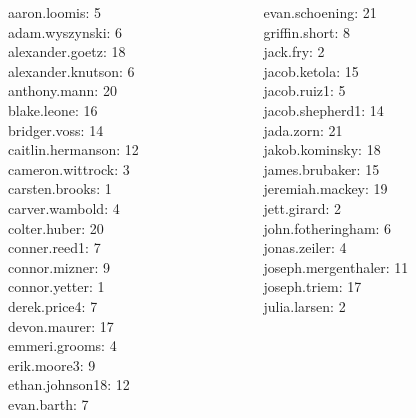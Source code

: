 \documentclass[10pt]{beamer}
\begin{document}
\begin{frame}
\footnotesize 
\vfill 
\begin{columns}
\begin{column}{0.33\textwidth}
aaron.loomis: 5 \\ 
adam.wyszynski: 6 \\ 
alexander.goetz: 18 \\ 
alexander.knutson: 6 \\ 
anthony.mann: 20 \\ 
blake.leone: 16 \\ 
bridger.voss: 14 \\ 
caitlin.hermanson: 12 \\ 
cameron.wittrock: 3 \\ 
carsten.brooks: 1 \\ 
carver.wambold: 4 \\ 
colter.huber: 20 \\ 
conner.reed1: 7 \\ 
connor.mizner: 9 \\ 
connor.yetter: 1 \\ 
derek.price4: 7 \\ 
devon.maurer: 17 \\ 
emmeri.grooms: 4 \\ 
erik.moore3: 9 \\ 
ethan.johnson18: 12 \\ 
evan.barth: 7 \\\end{column}
\begin{column}{0.33\textwidth}
evan.schoening: 21 \\ 
griffin.short: 8 \\ 
jack.fry: 2 \\ 
jacob.ketola: 15 \\ 
jacob.ruiz1: 5 \\ 
jacob.shepherd1: 14 \\ 
jada.zorn: 21 \\ 
jakob.kominsky: 18 \\ 
james.brubaker: 15 \\ 
jeremiah.mackey: 19 \\ 
jett.girard: 2 \\ 
john.fotheringham: 6 \\ 
jonas.zeiler: 4 \\ 
joseph.mergenthaler: 11 \\ 
joseph.triem: 17 \\ 
julia.larsen: 2 \\ 

\end{column}
\end{columns}
\end{frame}
\end{document}
